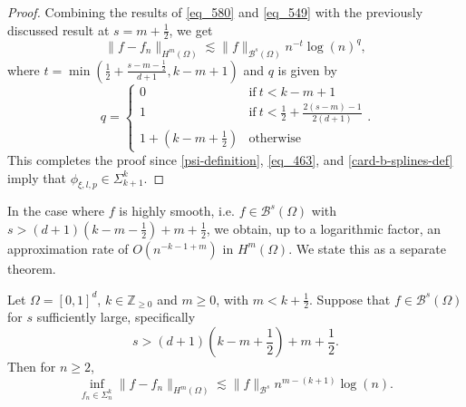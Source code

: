 \begin{proof}
 Combining the results of \eqref{eq_580} and \eqref{eq_549} with the previously discussed result at $s = m + \frac{1}{2}$, we get
 \begin{equation}
  \|f - f_n\|_{H^m(\Omega)} \lesssim \|f\|_{\mathcal{B}^s(\Omega)}n^{-t}\log(n)^q,
 \end{equation}
 where $t = \min\left(\frac{1}{2}+\frac{s-m-\frac{1}{2}}{d+1}, k-m+1\right)$ and $q$ is given by
 \begin{equation}
 q = \begin{cases}
            0 & \text{if}~t < k-m+1 \\
            1 & \text{if}~t < \frac{1}{2}+\frac{2(s-m)-1}{2(d+1)}\\
            1 + (k-m+\frac{1}{2}) & \text{otherwise}
           \end{cases}.
 \end{equation}
 This completes the proof since \eqref{psi-definition}, \eqref{eq_463}, and \eqref{card-b-splines-def} imply that $\phi_{\xi,l,p}\in \Sigma_{k+1}^k$.

\end{proof}

In the case where $f$ is highly smooth, i.e. $f\in \mathcal{B}^s(\Omega)$ with $s > (d+1)(k-m-\frac{1}{2})+m+\frac{1}{2}$, we obtain, up to a logarithmic factor, an approximation rate of $O(n^{-k-1+m})$ in $H^m(\Omega)$. We state this as a separate theorem.
\begin{theorem}\label{high-smoothness-approximation}
 Let $\Omega = [0,1]^d$, $k \in \mathbb{Z}_{\geq 0}$ and $m\geq 0$, with $m < k + \frac{1}{2}$. Suppose that $f\in \mathcal{B}^s(\Omega)$ for $s$ sufficiently large, specifically $$s > (d+1)\left(k-m+\frac{1}{2}\right) + m + \frac{1}{2}.$$ Then for $n\geq 2$,
 \begin{equation}\label{bound-equation}
  \inf_{f_n\in \Sigma^k_{n}}\|f - f_n\|_{H^m(\Omega)} \lesssim \|f\|_{\mathcal{B}^s}n^{m-(k+1)}\log(n).
 \end{equation}
\end{theorem}
